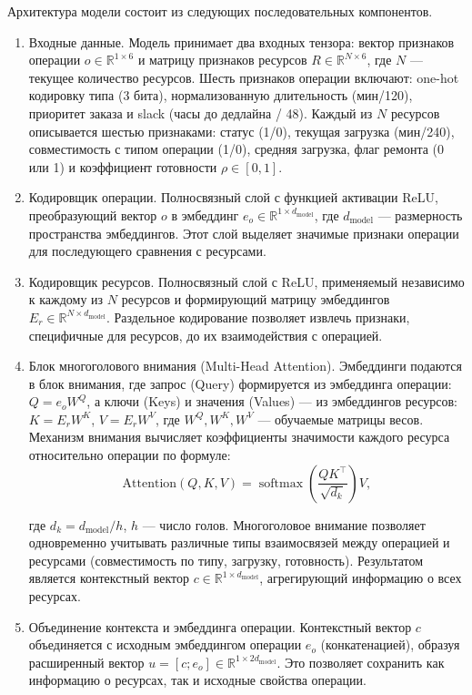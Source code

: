 Архитектура модели состоит из следующих последовательных компонентов.

\begin{enumerate}
\item Входные данные. Модель принимает два входных тензора: вектор признаков операции $o \in \mathbb{R}^{1 \times 6}$ и матрицу признаков ресурсов $R \in \mathbb{R}^{N \times 6}$, где $N$ — текущее количество ресурсов. Шесть признаков операции включают: one-hot кодировку типа (3 бита), нормализованную длительность (мин/120), приоритет заказа и slack (часы до дедлайна / 48). Каждый из $N$ ресурсов описывается шестью признаками: статус (1/0), текущая загрузка (мин/240), совместимость с типом операции (1/0), средняя загрузка, флаг ремонта (0 или 1) и коэффициент готовности $\rho \in [0,1]$.
\item Кодировщик операции. Полносвязный слой с функцией активации ReLU, преобразующий вектор $o$ в эмбеддинг $e_o \in \mathbb{R}^{1 \times d_{\text{model}}}$, где $d_{\text{model}}$ — размерность пространства эмбеддингов. Этот слой выделяет значимые признаки операции для последующего сравнения с ресурсами.
\item Кодировщик ресурсов. Полносвязный слой с ReLU, применяемый независимо к каждому из $N$ ресурсов и формирующий матрицу эмбеддингов $E_r \in \mathbb{R}^{N \times d_{\text{model}}}$. Раздельное кодирование позволяет извлечь признаки, специфичные для ресурсов, до их взаимодействия с операцией.
\item Блок многоголового внимания (Multi-Head Attention). Эмбеддинги подаются в блок внимания, где запрос (Query) формируется из эмбеддинга операции: $Q = e_o W^Q$, а ключи (Keys) и значения (Values) — из эмбеддингов ресурсов: $K = E_r W^K$, $V = E_r W^V$, где $W^Q, W^K, W^V$ — обучаемые матрицы весов. Механизм внимания вычисляет коэффициенты значимости каждого ресурса относительно операции по формуле:
    \begin{equation}
        \text{Attention}(Q, K, V) = \operatorname{softmax}\!\left(\frac{Q K^\top}{\sqrt{d_k}}\right) V,
    \end{equation}

где $d_k = d_{\text{model}} / h$, $h$ — число голов. Многоголовое внимание позволяет одновременно учитывать различные типы взаимосвязей между операцией и ресурсами (совместимость по типу, загрузку, готовность). Результатом является контекстный вектор $c \in \mathbb{R}^{1 \times d_{\text{model}}}$, агрегирующий информацию о всех ресурсах.

\item Объединение контекста и эмбеддинга операции. Контекстный вектор $c$ объединяется с исходным эмбеддингом операции $e_o$ (конкатенацией), образуя расширенный вектор $u = [c; e_o] \in \mathbb{R}^{1 \times 2d_{\text{model}}}$. Это позволяет сохранить как информацию о ресурсах, так и исходные свойства операции.


\end{enumerate}

